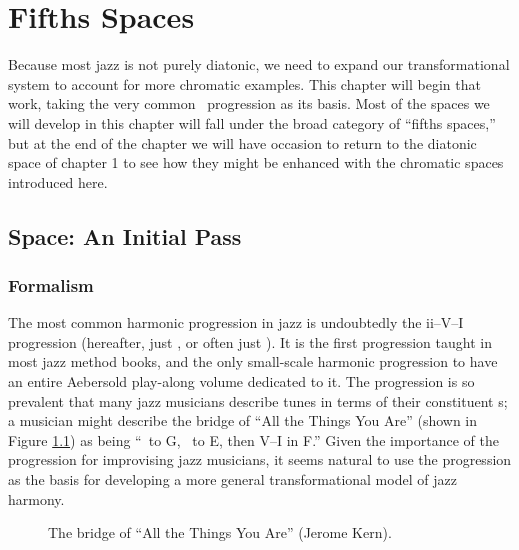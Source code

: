 
\chapter{Fifths Spaces}

%
%
Because most jazz is not purely diatonic, we need to expand our
transformational system to account for more chromatic examples. This chapter
will begin that work, taking the very common \tfo\ progression as its basis.
Most of the spaces we will develop in this chapter will fall under the broad
category of “fifths spaces,” but at the end of the chapter we will have
occasion to return to the diatonic space of chapter 1 to see how they might be
enhanced with the chromatic spaces introduced here.

\section{\tf Space: An Initial Pass}
\label{sec:tf-space-1}

\subsection{Formalism}

The most common harmonic progression in jazz is undoubtedly the
\mbox{ii--V--I} progression (hereafter, just \tfo, or
often just \tf). It is the first progression taught in most jazz method books,
and the only small-scale harmonic progression to have an entire Aebersold
play-along volume dedicated to it. The progression is so prevalent
that many jazz musicians describe tunes in terms of their constituent \tf{}s;
a musician might describe the bridge of “All the Things You Are” (shown in
Figure \ref{tf:all-things-bridge}) as being “\tf\ to G, \tf\ to E, then V--I
in F.” Given the importance of the progression for improvising jazz
musicians, it seems natural to use the progression as the basis for developing
a more general transformational model of jazz harmony.

\begin{figure}[tbp]
  \caption{The bridge of “All the Things You Are” (Jerome Kern).}
  \label{tf:all-things-bridge}
\end{figure}

